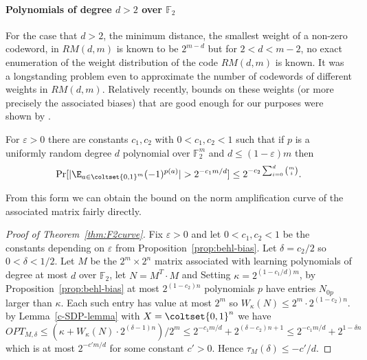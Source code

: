 \paragraph{Polynomials of degree $d>2$ over $\mathbb{F}_2$}
For the case that $d>2$, the minimum distance, the smallest 
weight of a non-zero codeword, in $RM(d,m)$ is known to be $2^{m-d}$ but
for $2<d<m-2$, no exact enumeration of the weight distribution of the code
$RM(d,m)$ is known.
It was a longstanding problem even to approximate the
number of codewords of different weights in $RM(d,m)$.  
Relatively recently, bounds on
these weights (or more precisely the associated biases) that are good enough
for our purposes were shown by
\cite{DBLP:journals/cc/Ben-EliezerHL12}.

\begin{proposition}
\label{prop:behl-bias}
For $\varepsilon>0$ there are constants $c_1, c_2$ with $0<c_1,c_2<1$ such that if $p$ is a uniformly random degree $d$ polynomial over
$\mathbb{F}^m_2$ and $d\le (1-\varepsilon)m$ then 
$$\Pr[|\E_{a\in \coltset{0,1}^m} (-1)^{p(a)}|>2^{-c_1 m/d}]\le 2^{-c_2 \sum_{i=0}^d \binom{m}{i}}.$$
\end{proposition}

From this form we can obtain the bound on the norm amplification curve
of the associated matrix fairly directly.

\begin{proof}[Proof of Theorem~\ref{thm:F2curve}]
Fix $\varepsilon>0$ and let $0<c_1, c_2<1$ be the constants depending on
$\varepsilon$ from Proposition~\ref{prop:behl-bias}.
Let $\delta=c_2/2$ so $0<\delta<1/2$.
Let $M$ be the $2^m\times 2^n$ matrix associated with learning 
polynomials of degree at most $d$ over $\mathbb{F}_2$, let $N=M^T\cdot M$ and
Setting $\kappa=2^{(1-c_1/d)m}$, by Proposition~\ref{prop:behl-bias} at
most $2^{(1-c_2)n}$ 
polynomials $p$ have entries $N_{0p}$ larger than $\kappa$.
Each such entry has value at most $2^m$ so 
$W_\kappa(N)\le 2^m\cdot 2^{(1-c_2)n}$.
by Lemma~\ref{c-SDP-lemma} with 
$X=\coltset{0,1}^n$ we have
$$OPT_{M,\delta}\le (\kappa+W_\kappa(N)\cdot 2^{(\delta-1)n})/2^m
\le 2^{-c_1 m/d}+2^{(\delta - c_2)n+1}\le 2^{-c_1 m/d}+2^{1-\delta n}$$
which is at most $2^{-c' m/d}$ for some constant $c'>0$. 
Hence $\tau_M(\delta)\le -c'/d$.
\end{proof}

